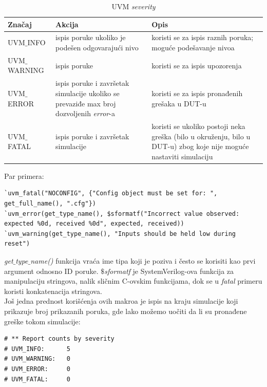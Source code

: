 \begin{table}[h!]
  \centering
  \begin{tabular}{|p{}|p{}|p{}|}
    \hline
    \textbf{Značaj} & \textbf{Akcija} & \textbf{Opis}\\
    \hline
    UVM\(\_\)INFO & ispis poruke ukoliko je podešen odgovarajući nivo & koristi se za ispis raznih poruka; moguće podešavanje nivoa\\
    \hline
    UVM\(\_\)WARNING & ispis poruke & koristi se za ispis upozorenja\\
    \hline
    UVM\(\_\)ERROR & ispis poruke i završetak simulacije ukoliko se prevaziđe max broj dozvoljenih \emph{error}-a & koristi se za ispis pronađenih grešaka u DUT-u\\
    \hline
    UVM\(\_\)FATAL & ispis poruke i završetak simulacije & koristi se ukoliko postoji neka greška (bilo u okruženju, bilo u DUT-u) zbog koje nije moguće nastaviti simulaciju\\
    \hline
  \end{tabular}
  \caption{UVM \emph{severity}}
  \label{tab:uvm_severity}
\end{table}

Par primera:

\begin{lstlisting}
`uvm_fatal("NOCONFIG", {"Config object must be set for: ", get_full_name(), ".cfg"})
`uvm_error(get_type_name(), $sformatf("Incorrect value observed: expected %0d, received %0d", expected, received))
`uvm_warning(get_type_name(), "Inputs should be held low during reset")
\end{lstlisting}

\emph{get\(\_\)type\(\_\)name()} funkcija vraća ime tipa koji je poziva i često
se korisiti kao prvi argument odnosno ID poruke. \emph{\(\$\)sformatf} je
SystemVerilog-ova funkcija za manipulaciju stringova, nalik sličnim C-ovskim
funkcijama, dok se u \emph{fatal} primeru koristi konkatenacija stringova.\\

Još jedna prednost korišćenja ovih makroa je ispis na kraju simulacije koji
prikazuje broj prikazanih poruka, gde lako možemo uočiti da li su pronađene
greške tokom simulacije: \\

\begin{verbatim}
# ** Report counts by severity
# UVM_INFO:      5
# UVM_WARNING:   0
# UVM_ERROR:     0
# UVM_FATAL:     0
\end{verbatim}

